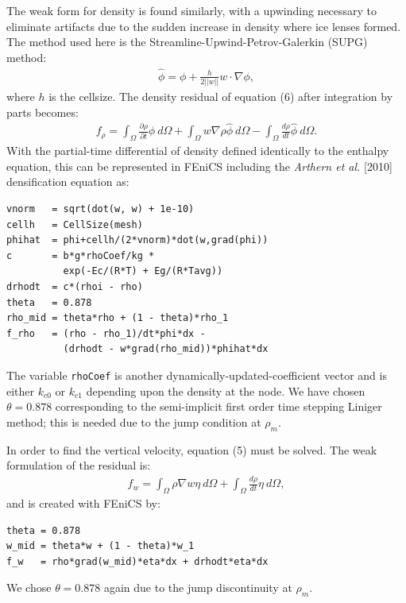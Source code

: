 \documentclass{article}%
\begin{document}
The weak form for density is found similarly, with a upwinding necessary to eliminate artifacts due to the sudden increase in density where ice lenses formed.  The method used here is the Streamline-Upwind-Petrov-Galerkin (SUPG) method:
\begin{align*}
    \hat{\phi} = \phi + \frac{h}{2||w||} w \cdot \nabla{\phi},
\end{align*}
where $h$ is the cellsize.  The density residual of equation (6) after integration by parts becomes:
\begin{align}
  f_{\rho} = 
    \int_{\Omega} \frac{\partial \rho}{\partial t}\phi\ d \Omega + 
    \int_{\Omega} w\nabla \rho \hat{\phi}\ d \Omega -
    \int_{\Omega}\frac{d \rho}{dt}\hat{\phi}\ d \Omega.
\end{align}
With the partial-time differential of density defined identically to the enthalpy equation, this can be represented in FEniCS including the \emph{Arthern et al.} [2010] densification equation as:\par
\footnotesize
\begin{verbatim}
vnorm   = sqrt(dot(w, w) + 1e-10)
cellh   = CellSize(mesh)
phihat  = phi+cellh/(2*vnorm)*dot(w,grad(phi))
c       = b*g*rhoCoef/kg * 
          exp(-Ec/(R*T) + Eg/(R*Tavg))
drhodt  = c*(rhoi - rho)
theta   = 0.878
rho_mid = theta*rho + (1 - theta)*rho_1
f_rho   = (rho - rho_1)/dt*phi*dx - 
          (drhodt - w*grad(rho_mid))*phihat*dx
\end{verbatim}
\normalsize
The variable \texttt{rhoCoef} is another dynamically-updated-coefficient vector and is either $k_{c0}$ or $k_{c1}$ depending upon the density at the node.  We have chosen $\theta = 0.878$ corresponding to the semi-implicit first order time stepping Liniger method; this is needed due to the jump condition at $\rho_m$.

In order to find the vertical velocity, equation (5) must be solved.  The weak formulation of the residual is:
\begin{align}
  f_{w} = 
    \int_{\Omega} \rho \nabla{w} \eta\ d\Omega + \int_{\Omega} \frac{d\rho}{dt} \eta\ d\Omega,
\end{align}
and is created with FEniCS by:
\footnotesize
\begin{verbatim}
theta = 0.878
w_mid = theta*w + (1 - theta)*w_1
f_w   = rho*grad(w_mid)*eta*dx + drhodt*eta*dx
\end{verbatim}
\normalsize
We chose $\theta=0.878$ again due to the jump discontinuity at $\rho_m$.
\end{document}
